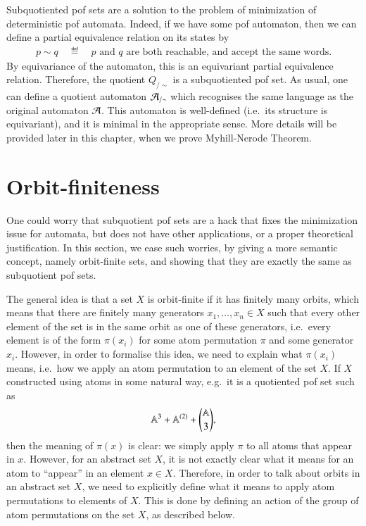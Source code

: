 Subquotiented pof sets are a solution to the problem of minimization of deterministic pof automata. Indeed, if we have some pof automaton, then we can define a partial equivalence relation on its states by 
\begin{align*}
p \sim q \quad \eqdef \quad  \text{$p$ and $q$ are both reachable, and accept the same words}.
\end{align*}
By equivariance of the automaton, this is an equivariant partial equivalence relation. Therefore, the quotient $Q_{/\sim}$ is a subquotiented pof set. As usual, one can define a quotient automaton ${\mathcal A}_{/\sim}$ which recognises the same language as the original automaton ${\mathcal A}$. This automaton is well-defined (i.e.~its structure is equivariant), and it is minimal in the appropriate sense. More details will be provided later in this chapter, when we prove  Myhill-Nerode Theorem. 

\exercisepart

\section{Orbit-finiteness}
\label{sec:orbit-finiteness-equality}
One could worry that subquotient pof sets are a hack that fixes the minimization issue for automata, but does not have other applications, or a proper theoretical justification. In this section, we ease such worries, by giving a more semantic concept, namely orbit-finite sets, and showing that they are exactly the same as subquotient pof sets.

The general idea is that a set $X$ is orbit-finite if it has finitely many orbits, which means that there are finitely many generators  $x_1,\ldots,x_n \in X$ such that every other element of the set is in the same orbit as one of these generators, i.e.~every element is of the form $\pi(x_i)$ for some atom permutation $\pi$ and some generator $x_i$.  However, in order to formalise this idea, we need to explain what $\pi(x_i)$ means, i.e.~how we apply an atom permutation to an element of the set $X$. If $X$ constructed using atoms in some natural way, e.g.~it is a quotiented pof set such as \begin{align*}
\mathbb A^3 + \mathbb A^{(2)} + {\mathbb A \choose 3},
\end{align*}
then the meaning of $\pi(x)$ is clear: we simply apply $\pi$ to all atoms that appear in $x$. However, for an abstract set $X$, it is not exactly clear what it means for an atom to ``appear'' in an element $x \in X$. Therefore, in order to talk about orbits in an abstract set $X$, we need to explicitly define what it means to apply atom permutations to elements of $X$. This is done by defining an action of the group of atom permutations on the set $X$, as described below. 


